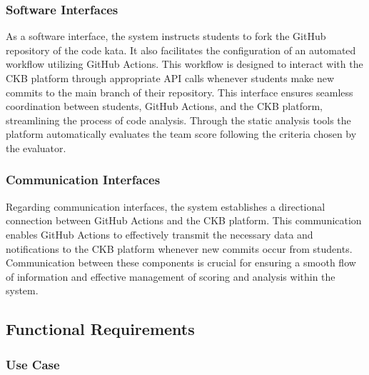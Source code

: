 \documentclass[12pt,oneside,a4paper]{article}
\begin{document}
\subsubsection{Software Interfaces}
As a software interface, the system instructs students to fork the GitHub repository of the code kata. It also facilitates the configuration of an automated workflow utilizing GitHub Actions. This workflow is designed to interact with the CKB platform through appropriate API calls whenever students make new commits to the main branch of their repository.  
This interface ensures seamless coordination between students, GitHub Actions, and the CKB platform, streamlining the process of code analysis. Through the static analysis tools the platform automatically evaluates the team score following the criteria chosen by the evaluator.
 
\subsubsection{Communication Interfaces}
Regarding communication interfaces, the system establishes a directional connection between GitHub Actions and the CKB platform. This communication enables GitHub Actions to effectively transmit the necessary data and notifications to the CKB platform whenever new commits occur from students. Communication between these components is crucial for ensuring a smooth flow of information and effective management of scoring and analysis within the system. 

\clearpage

\subsection{Functional Requirements}

\subsubsection{Use Case}
\end{document}
